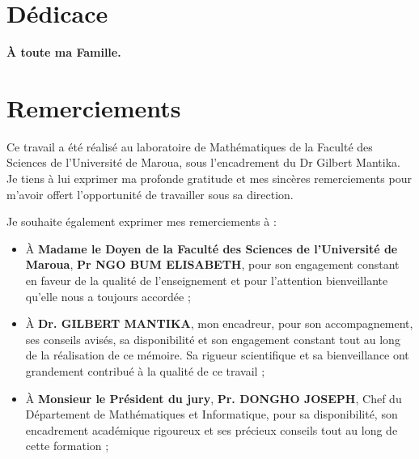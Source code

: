 \documentclass[a4paper, 14pt]{report}
\newcommand{\applyfontsize}{%
	\fontsize{12}{12}\selectfont
}
\begin{document}
\newpage
\begin{onehalfspace} %
\lhead{}
\rhead{}
\chead{}


\chapter*{Dédicace}

\begin{center}
	
	\vspace{8cm}
	
\textbf{\textbf{ \LARGE À toute ma Famille.}}
\vspace{1cm} %
\end{center}

\chapter*{Remerciements}
{
	\applyfontsize %
	
Ce travail a été réalisé au laboratoire de Mathématiques de la Faculté des Sciences de l’Université de Maroua, sous l’encadrement du Dr Gilbert Mantika. Je tiens à lui exprimer ma profonde gratitude et mes sincères remerciements pour m’avoir offert l’opportunité de travailler sous sa direction.

Je souhaite également exprimer mes remerciements à :
\begin{itemize}
	\item À \textbf{Madame le Doyen de la Faculté des Sciences de l’Université de Maroua}, \textbf{Pr NGO BUM ELISABETH}, pour son engagement constant en faveur de la qualité de l’enseignement et pour l’attention bienveillante qu’elle nous a toujours accordée ;
	
	\item À \textbf{Dr. GILBERT MANTIKA}, mon encadreur, pour son accompagnement, ses conseils avisés, sa disponibilité et son engagement constant tout au long de la réalisation de ce mémoire. Sa rigueur scientifique et sa bienveillance ont grandement contribué à la qualité de ce travail ;
	
	
	\item À \textbf{Monsieur le Président du jury}, \textbf{Pr. DONGHO JOSEPH}, Chef du Département de Mathématiques et Informatique, pour sa disponibilité, son encadrement académique rigoureux et ses précieux conseils tout au long de cette formation ;
	

\end{itemize}}
\end{onehalfspace}
\end{document}
